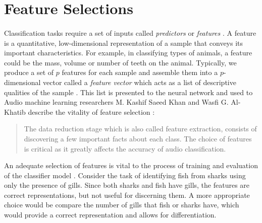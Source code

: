 \documentclass[12pt,letterpaper]{article}
\begin{document}

\newpage
\section{Feature Selections}
\label{sec-Features}

\paragraph*{}Classification tasks require a set of inputs called \textit{predictors} or \textit{features} \cite{James,Loy,Serizel}. A feature is a quantitative, low-dimensional representation of a sample that conveys its important characteristics. For example, in classifying types of animals, a feature could be the mass, volume or number of teeth on the animal. Typically, we produce a set of $p$ features for each sample and assemble them into a $p$-dimensional vector called a \textit{feature vector} which acts as a list of descriptive qualities of the sample \cite{Geron,James}. This list is presented to the neural network and used to 
Audio machine learning researchers M. Kashif Saeed Khan and Wasfi G. Al-Khatib describe the vitality of feature selection \cite{Khan}:
\begin{quote}
The data reduction stage which is also called feature extraction, consists of discovering a few important facts about each class. The choice of features is critical as it greatly affects the accuracy of audio classification. 
\end{quote}
An adequate selection of features is vital to the process of training and evaluation of the classifier model \cite{Mierswa,Serizel,Liu}. Consider the task of identifying fish from sharks using only the presence of gills. Since both sharks and fish have gills, the features are correct representations, but not useful for discerning them. A more appropriate choice would be compare the number of gills that fish or sharks have, which would provide a correct representation and allows for differentiation.
\end{document}
